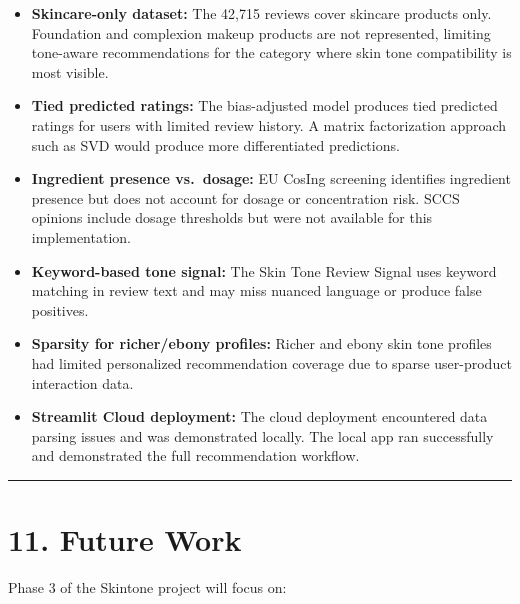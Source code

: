 \documentclass[
  letterpaper,
  DIV=11,
  numbers=noendperiod]{scrartcl}
\begin{document}
\begin{itemize}
\item
  \textbf{Skincare-only dataset:} The 42,715 reviews cover skincare
  products only. Foundation and complexion makeup products are not
  represented, limiting tone-aware recommendations for the category
  where skin tone compatibility is most visible.
\item
  \textbf{Tied predicted ratings:} The bias-adjusted model produces tied
  predicted ratings for users with limited review history. A matrix
  factorization approach such as SVD would produce more differentiated
  predictions.
\item
  \textbf{Ingredient presence vs.~dosage:} EU CosIng screening
  identifies ingredient presence but does not account for dosage or
  concentration risk. SCCS opinions include dosage thresholds but were
  not available for this implementation.
\item
  \textbf{Keyword-based tone signal:} The Skin Tone Review Signal uses
  keyword matching in review text and may miss nuanced language or
  produce false positives.
\item
  \textbf{Sparsity for richer/ebony profiles:} Richer and ebony skin
  tone profiles had limited personalized recommendation coverage due to
  sparse user-product interaction data.
\item
  \textbf{Streamlit Cloud deployment:} The cloud deployment encountered
  data parsing issues and was demonstrated locally. The local app ran
  successfully and demonstrated the full recommendation workflow.
\end{itemize}

\begin{center}\rule{0.5\linewidth}{0.5pt}\end{center}

\section{11. Future Work}\label{future-work}

Phase 3 of the Skintone project will focus on:
\end{document}
